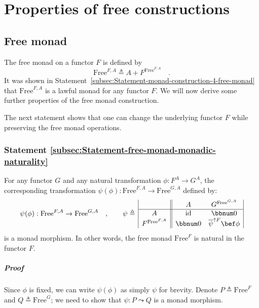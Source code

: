 \section{Properties of free constructions}

\subsection{Free monad}

The free monad on a functor $F$ is defined by
\[
\text{Free}^{F,A}\triangleq A+F^{\text{Free}^{F,A}}\quad.
\]
It was shown in Statement~\ref{subsec:Statement-monad-construction-4-free-monad}
that $\text{Free}^{F,A}$ is a lawful monad for any functor $F$.
We will now derive some further properties of the free monad construction.

The next statement shows that one can change the underlying functor
$F$ while preserving the free monad operations.

\subsubsection{Statement \label{subsec:Statement-free-monad-monadic-naturality}\ref{subsec:Statement-free-monad-monadic-naturality}}

For any functor $G$ and any natural transformation $\phi:F^{A}\rightarrow G^{A}$,
the corresponding transformation $\psi(\phi):\text{Free}^{F,A}\rightarrow\text{Free}^{G,A}$
defined by:
\[
\psi(\phi):\text{Free}^{F,A}\rightarrow\text{Free}^{G,A}\quad,\quad\quad\psi\triangleq\,\begin{array}{|c||cc|}
 & A & G^{\text{Free}^{G,A}}\\
\hline A & \text{id} & \bbnum 0\\
F^{\text{Free}^{F,A}} & \bbnum 0 & \overline{\psi}^{\uparrow F}\bef\phi
\end{array}
\]
is a monad morphism. In other words, the free monad $\text{Free}^{F}$
is natural in the functor $F$. 

\subparagraph{Proof}

Since $\phi$ is fixed, we can write $\psi(\phi)$ as simply $\psi$
for brevity. Denote $P\triangleq\text{Free}^{F}$ and $Q\triangleq\text{Free}^{G}$;
we need to show that $\psi:P\leadsto Q$ is a monad morphism.

